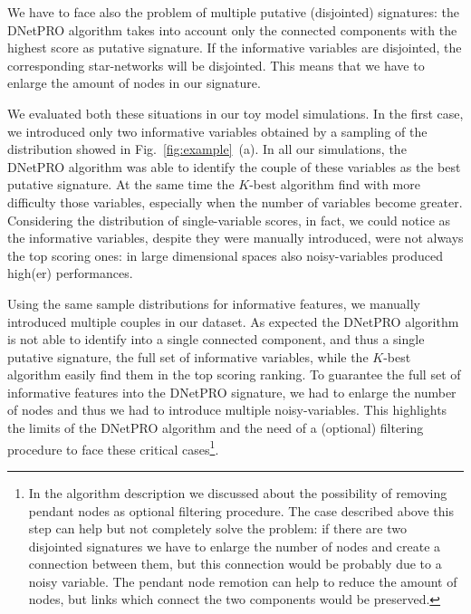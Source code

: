\documentclass{standalone}
\begin{document}
We have to face also the problem of multiple putative (disjointed) signatures: the \textsf{DNetPRO} algorithm takes into account only the connected components with the highest score as putative signature.
If the informative variables are disjointed, the corresponding star-networks will be disjointed.%
This means that we have to enlarge the amount of nodes in our signature.%

We evaluated both these situations in our toy model simulations.
In the first case, we introduced only two informative variables obtained by a sampling of the distribution showed in Fig.~\ref{fig:example}~(a).
In all our simulations, the \textsf{DNetPRO} algorithm was able to identify the couple of these variables as the best putative signature.
At the same time the $K$-best algorithm find with more difficulty those variables, especially when the number of variables become greater.
Considering the distribution of single-variable scores, in fact, we could notice as the informative variables, despite they were manually introduced, were not always the top scoring ones: in large dimensional spaces also noisy-variables produced high(er) performances.

Using the same sample distributions for informative features, we manually introduced multiple couples in our dataset.
As expected the \textsf{DNetPRO} algorithm is not able to identify into a single connected component, and thus a single putative signature, the full set of informative variables, while the $K$-best algorithm easily find them in the top scoring ranking.
To guarantee the full set of informative features into the \textsf{DNetPRO} signature, we had to enlarge the number of nodes and thus we had to introduce multiple noisy-variables.
This highlights the limits of the \textsf{DNetPRO} algorithm and the need of a (optional) filtering procedure to face these critical cases\footnote{
  In the algorithm description we discussed about the possibility of removing pendant nodes as optional filtering procedure.
  The case described above this step can help but not completely solve the problem: if there are two disjointed signatures we have to enlarge the number of nodes and create a connection between them, but this connection would be probably due to a noisy variable.
  The pendant node remotion can help to reduce the amount of nodes, but links which connect the two components would be preserved.
}.

\end{document}
